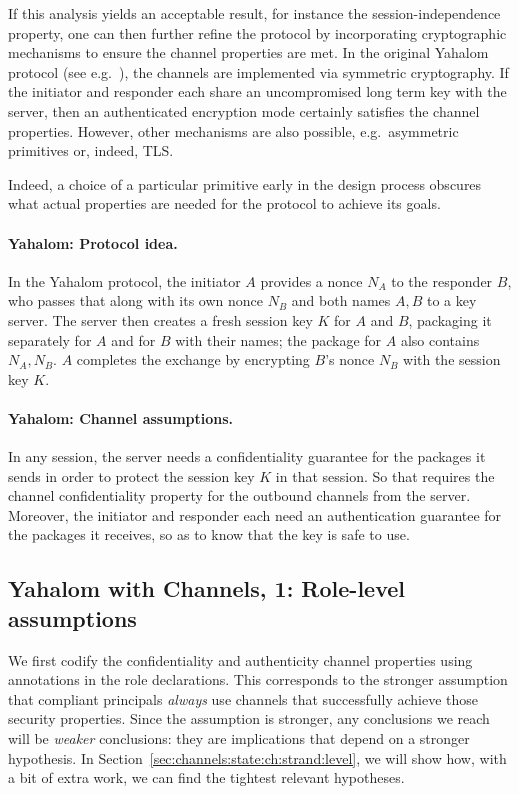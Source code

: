 If this analysis yields an acceptable result, for instance the
session-independence property, one can then further refine the
protocol by incorporating cryptographic mechanisms to ensure the
channel properties are met.  In the original Yahalom protocol (see
e.g.~\cite{Paulson97c}), the channels are implemented via symmetric
cryptography.  If the initiator and responder each share an
uncompromised long term key with the server, then an authenticated
encryption mode certainly satisfies the channel properties.  However,
other mechanisms are also possible, e.g.~asymmetric primitives or,
indeed, TLS.

Indeed, a choice of a particular primitive early in the design process
obscures what actual properties are needed for the protocol to achieve
its goals.

\paragraph{Yahalom:  Protocol idea.}  In the Yahalom protocol, the
initiator $A$ provides a nonce $N_A$ to the responder $B$, who passes
that along with its own nonce $N_B$ and both names $A,B$ to a key
server.  The server then creates a fresh session key $K$ for $A$ and
$B$, packaging it separately for $A$ and for $B$ with their names; the
package for $A$ also contains $N_A,N_B$.  $A$ completes the exchange
by encrypting $B$'s nonce $N_B$ with the session key $K$.

\paragraph{Yahalom:  Channel assumptions.}  In any session, the server
needs a confidentiality guarantee for the packages it sends in order
to protect the session key $K$ in that session.  So that requires the
channel confidentiality property for the outbound channels from the
server.  Moreover, the initiator and responder each need an
authentication guarantee for the packages it receives, so as to know
that the key is safe to use.

\subsection{Yahalom with Channels, 1:  Role-level assumptions}
\label{sec:channels:state:ch:role:level}

We first codify the confidentiality and authenticity channel
properties using annotations in the role declarations.  This
corresponds to the stronger assumption that compliant principals
\emph{always} use channels that successfully achieve those security
properties.  Since the assumption is stronger, any conclusions we
reach will be \emph{weaker} conclusions: they are implications that
depend on a stronger hypothesis.  In
Section~\ref{sec:channels:state:ch:strand:level}, we will show how,
with a bit of extra work, we can find the tightest relevant
hypotheses.

